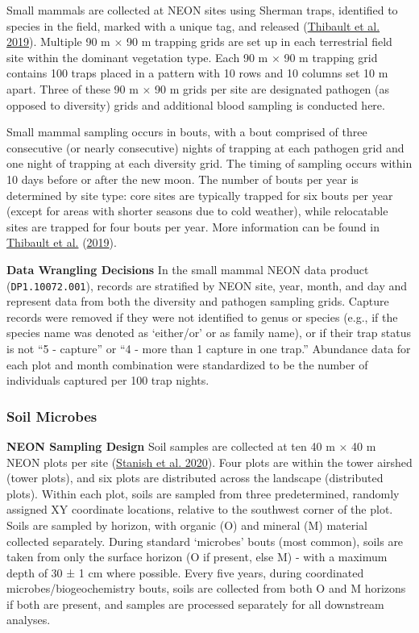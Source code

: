 \documentclass[
  12pt,
]{article}
\begin{document}
Small mammals are collected at NEON sites using Sherman traps, identified to species in the field, marked with a unique tag, and released (\protect\hyperlink{ref-thibault2019TOS}{Thibault et al. 2019}). Multiple 90 m \(\times\) 90 m trapping grids are set up in each terrestrial field site within the dominant vegetation type. Each 90 m \(\times\) 90 m trapping grid contains 100 traps placed in a pattern with 10 rows and 10 columns set 10 m apart. Three of these 90 m \(\times\) 90 m grids per site are designated pathogen (as opposed to diversity) grids and additional blood sampling is conducted here.

Small mammal sampling occurs in bouts, with a bout comprised of three consecutive (or nearly consecutive) nights of trapping at each pathogen grid and one night of trapping at each diversity grid. The timing of sampling occurs within 10 days before or after the new moon. The number of bouts per year is determined by site type: core sites are typically trapped for six bouts per year (except for areas with shorter seasons due to cold weather), while relocatable sites are trapped for four bouts per year. More information can be found in \protect\hyperlink{ref-thibault2019TOS}{Thibault et al.} (\protect\hyperlink{ref-thibault2019TOS}{2019}).

\textbf{Data Wrangling Decisions} In the small mammal NEON data product (\texttt{DP1.10072.001}), records are stratified by NEON site, year, month, and day and represent data from both the diversity and pathogen sampling grids. Capture records were removed if they were not identified to genus or species (e.g., if the species name was denoted as `either/or' or as family name), or if their trap status is not ``5 - capture'' or ``4 - more than 1 capture in one trap.'' Abundance data for each plot and month combination were standardized to be the number of individuals captured per 100 trap nights.

\hypertarget{soil-microbes}{%
\subsubsection{Soil Microbes}\label{soil-microbes}}

\textbf{NEON Sampling Design} Soil samples are collected at ten 40 m \(\times\) 40 m NEON plots per site (\protect\hyperlink{ref-Stanish2020}{Stanish et al. 2020}). Four plots are within the tower airshed (tower plots), and six plots are distributed across the landscape (distributed plots). Within each plot, soils are sampled from three predetermined, randomly assigned XY coordinate locations, relative to the southwest corner of the plot. Soils are sampled by horizon, with organic (O) and mineral (M) material collected separately. During standard `microbes' bouts (most common), soils are taken from only the surface horizon (O if present, else M) - with a maximum depth of 30 ± 1 cm where possible. Every five years, during coordinated microbes/biogeochemistry bouts, soils are collected from both O and M horizons if both are present, and samples are processed separately for all downstream analyses.
\end{document}
